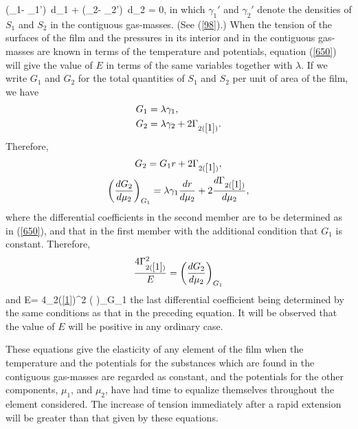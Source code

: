 \documentclass[12pt]{article}
\begin{document}
\eqs (\gamma_1- \gamma_1')\, d\mu_1 + (\gamma_2- \gamma_2')\, d\mu_2 = 0,   \label{651}\eqe
in which $\gamma_1'$ and $\gamma_2'$ denote the densities of $S_1$ and $S_2$ in the contiguous gas-masses. (See (\ref{98}).) When the tension of the surfaces of the film and the pressures in its interior and in the contiguous gas-masses are known in terms of the temperature and potentials, equation (\ref{650}) will give the value of $E$ in terms of the same variables together with $\lambda$.
If we write $G_1$  and $G_2$ for the total quantities of $S_1$ and $S_2$ per
unit of area of the film, we have
\begin{align}G_1&=\lambda \gamma_1,  \label{652} \\
G_2&= \lambda \gamma_2 + 2\Gamma_{2(\ref{1})}.    \label{653} \end{align}
Therefore,
\begin{gather}G_2 = G_1 r + 2\Gamma_{2(\ref{1})}, \nonumber \\
\left(\frac{dG_2}{d\mu_2} \right)_{G_1}= \lambda \gamma_1 \frac{dr}{d\mu_2} +2 \frac{d\Gamma_{2(\ref{1})}}{d\mu_2},   \label{654} \end{gather}
where the differential coefficients in the second member are to be determined as in (\ref{650}), and that in the first member with the additional condition that $G_1$  is constant. Therefore,
$$\frac{4\Gamma_{2(\ref{1})}^2}{E}  = \left(\frac{dG_2}{d\mu_2} \right)_{G_1}$$
and
\eqs   E= 4\Gamma_{2(\ref{1})}^2  \left( \right)_{G_1}    \label{655} \eqe 
the last differential coefficient being determined by the same conditions as that in the preceding equation. It will be observed that the value of $E$ will be positive in any ordinary case.

These equations give the elasticity of any element of the film when the temperature and the potentials for the substances which are found in the contiguous gas-masses are regarded as constant, and the potentials for the other components, $\mu_1$, and $\mu_2$, have had time to equalize themselves throughout the element considered. The increase of tension immediately after a rapid extension will be greater than that given by these equations.
\end{document}

